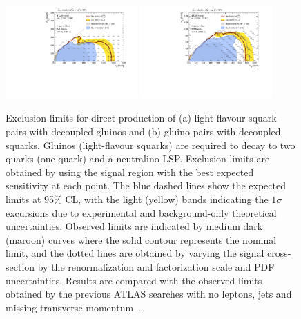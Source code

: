 \begin{figure}[tbph]
\begin{center}
\includegraphics[width=0.45\textwidth]{figures/ATLAS-CONF-2016-078_INT/Sensitivity/RJR/atlasCLs_SS_direct_showSR}
\includegraphics[width=0.45\textwidth]{figures/ATLAS-CONF-2016-078_INT/Sensitivity/RJR/atlasCLs_GG_direct_showSR}
\end{center}
\caption{Exclusion limits for direct production of (a) light-flavour squark pairs with decoupled gluinos and (b) gluino pairs with decoupled squarks.
Gluinos (light-flavour squarks) are required to decay to two quarks (one quark) and a neutralino LSP.
Exclusion limits are obtained by using the signal region with the best expected sensitivity at each point.
The blue dashed lines show the expected limits at 95\% CL, with the light (yellow) bands indicating the $1\sigma$ excursions due to experimental and background-only  theoretical uncertainties.
Observed limits are indicated by medium dark (maroon) curves where the solid contour represents the nominal limit, and the dotted lines are obtained by varying the signal cross-section by the renormalization and factorization scale and PDF uncertainties.
Results are compared with the observed limits obtained by the previous ATLAS searches with no leptons, jets and missing transverse momentum~\cite{0-leptonPaper,0LPaper_13TeV}.}
\label{fig:sensitivitytext}
\end{figure}
